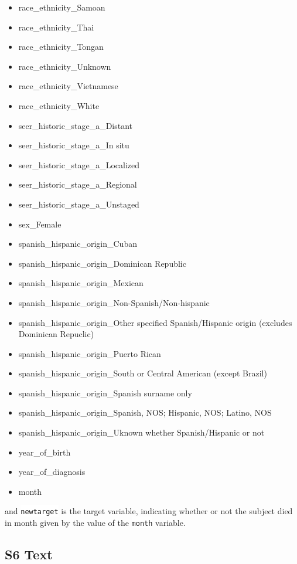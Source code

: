 \documentclass[10pt,letterpaper]{article}
\newcommand{\codewhite}[1]{\colorbox{white}{\texttt{#1}}}
\begin{document}
\begin{itemize}[noitemsep]
\item race\_ethnicity\_Samoan
\item race\_ethnicity\_Thai
\item race\_ethnicity\_Tongan
\item race\_ethnicity\_Unknown
\item race\_ethnicity\_Vietnamese
\item race\_ethnicity\_White
\item seer\_historic\_stage\_a\_Distant
\item seer\_historic\_stage\_a\_In situ
\item seer\_historic\_stage\_a\_Localized
\item seer\_historic\_stage\_a\_Regional
\item seer\_historic\_stage\_a\_Unstaged
\item sex\_Female
\item spanish\_hispanic\_origin\_Cuban
\item spanish\_hispanic\_origin\_Dominican Republic
\item spanish\_hispanic\_origin\_Mexican
\item spanish\_hispanic\_origin\_Non-Spanish/Non-hispanic
\item spanish\_hispanic\_origin\_Other specified Spanish/Hispanic origin (excludes Dominican Repuclic)
\item spanish\_hispanic\_origin\_Puerto Rican
\item spanish\_hispanic\_origin\_South or Central American (except Brazil)
\item spanish\_hispanic\_origin\_Spanish surname only
\item spanish\_hispanic\_origin\_Spanish, NOS; Hispanic, NOS; Latino, NOS
\item spanish\_hispanic\_origin\_Uknown whether Spanish/Hispanic or not
\item year\_of\_birth
\item year\_of\_diagnosis
\item month
\end{itemize}


and 
\codewhite{newtarget} is the target variable, indicating whether or not the subject died in month given by the value of the \codewhite{month} variable.

\subsection*{S6 Text}
\label{S6_Text}
\end{document}
